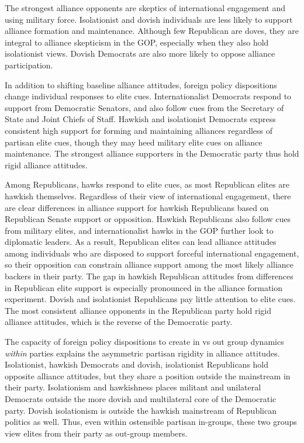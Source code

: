 \documentclass[12pt]{article}
\begin{document}
The strongest alliance opponents are skeptics of international engagement and using military force. 
Isolationist and dovish individuals are less likely to support alliance formation and maintenance. 
Although few Republican are doves, they are integral to alliance skepticism in the GOP, especially when they also hold isolationist views.
Dovish Democrats are also more likely to oppose alliance participation.  


In addition to shifting baseline alliance attitudes, foreign policy dispositions change individual responses to elite cues. 
Internationalist Democrats respond to support from Democratic Senators, and also follow cues from the Secretary of State and Joint Chiefs of Staff. 
Hawkish and isolationist Democrats express consistent high support for forming and maintaining alliances regardless of partisan elite cues, though they may heed military elite cues on alliance maintenance. 
The strongest alliance supporters in the Democratic party thus hold rigid alliance attitudes.


Among Republicans, hawks respond to elite cues, as most Republican elites are hawkish themselves. 
Regardless of their view of international engagement, there are clear differences in alliance support for hawkish Republicans based on Republican Senate support or opposition.
Hawkish Republicans also follow cues from military elites, and internationalist hawks in the GOP further look to diplomatic leaders. 
As a result, Republican elites can lead alliance attitudes among individuals who are disposed to support forceful international engagement, so their opposition can constrain alliance support among the most likely alliance backers in their party. 
The gap in hawkish Republican attitudes from differences in Republican elite support is especially pronounced in the alliance formation experiment. 
Dovish and isolationist Republicans pay little attention to elite cues. 
The most consistent alliance opponents in the Republican party hold rigid alliance attitudes, which is the reverse of the Democratic party. 


The capacity of foreign policy dispositions to create in vs out group dynamics \textit{within} parties explains the asymmetric partisan rigidity in alliance attitudes. 
Isolationist, hawkish Democrats and dovish, isolationist Republicans hold opposite alliance attitudes, but they share a position outside the mainstream in their party.
Isolationism and hawkishness places militant and unilateral Democrats outside the more dovish and multilateral core of the Democratic party. 
Dovish isolationism is outside the hawkish mainstream of Republican politics as well. 
Thus, even within ostensible partisan in-groups, these two groups view elites from their party as out-group members.  
\end{document}
